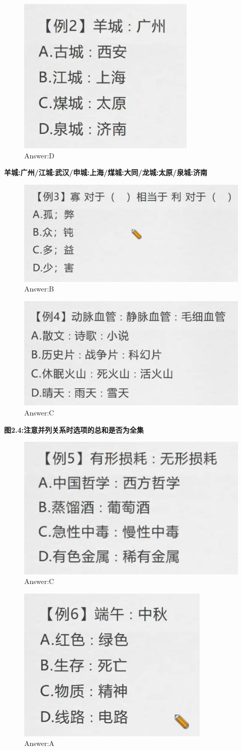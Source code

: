\documentclass{article}
\numberwithin{equation}{section}						%
\numberwithin{figure}{section}							%
\begin{document}
\begin{sloppypar}
\begin{figure}[H]
     \centering
     \includegraphics[width=0.4\linewidth]{102.png}
		\caption{Answer:D}
\end{figure}

\textbf{羊城:广州/江城:武汉/申城:上海/煤城:大同/龙城:太原/泉城:济南}

\begin{figure}[H]
     \centering
     \includegraphics[width=0.4\linewidth]{103.png}
		\caption{Answer:B}
\end{figure}


\begin{figure}[H]
     \centering
     \includegraphics[width=0.4\linewidth]{104.png}
		\caption{Answer:C}
\end{figure}

\textbf{图2.4:注意并列关系时选项的总和是否为全集}

\begin{figure}[H]
     \centering
     \includegraphics[width=0.4\linewidth]{105.png}
		\caption{Answer:C}
\end{figure}


\begin{figure}[H]
     \centering
     \includegraphics[width=0.4\linewidth]{106.png}
		\caption{Answer:A}
\end{figure}



\end{sloppypar}
\end{document}
